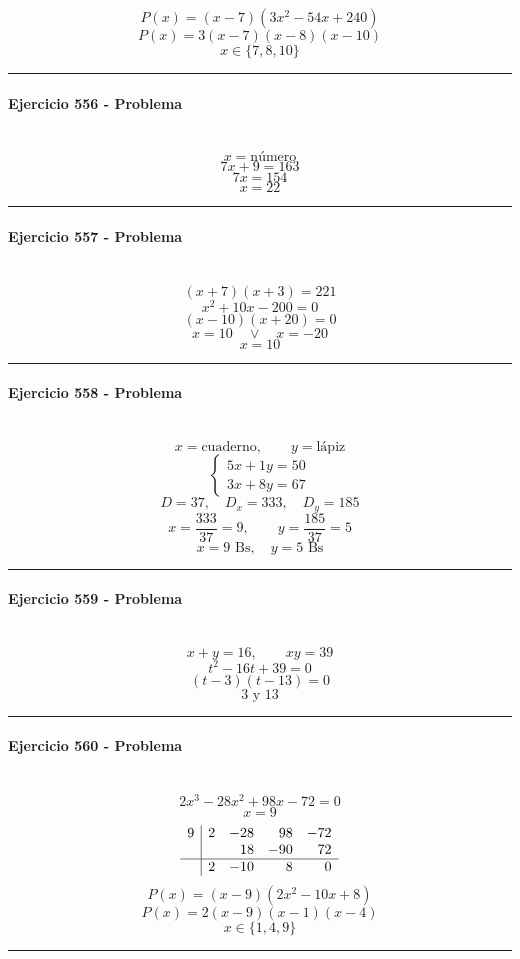 \documentclass[10pt,a4paper]{article}
\newcommand{\res}[1]{\paragraph{#1}\mbox{}\\[-1.2em]}
\begin{document}
\[ P(x)=(x-7)(3 x^{2} - 54 x + 240) \]
\[ P(x)=3(x-7)(x-8)(x-10) \]
\[ \boxed{x\in\{7,8,10\}} \]
\vspace{1mm}\hrule\vspace{2mm}
\res{Ejercicio 556 - Problema}
\[ x=\text{número} \]
\[ 7x+9=163 \]
\[ 7x=154 \]
\[ \boxed{x=22} \]
\vspace{1mm}\hrule\vspace{2mm}
\res{Ejercicio 557 - Problema}
\[ (x+7)(x+3)=221 \]
\[ x^{2} + 10 x - 200=0 \]
\[ (x-10)(x+20)=0 \]
\[ x=10\quad \vee \quad x=-20 \]
\[ \boxed{x=10} \]
\vspace{1mm}\hrule\vspace{2mm}
\res{Ejercicio 558 - Problema}
\[ x=\text{cuaderno},\qquad y=\text{lápiz} \]
\[ \begin{cases}5x+1y=50\\3x+8y=67\end{cases} \]
\[ D=37,\quad D_x=333,\quad D_y=185 \]
\[ x=\frac{333}{37}=9,\qquad y=\frac{185}{37}=5 \]
\[ \boxed{x=9\text{ Bs},\quad y=5\text{ Bs}} \]
\vspace{1mm}\hrule\vspace{2mm}
\res{Ejercicio 559 - Problema}
\[ x+y=16,\qquad xy=39 \]
\[ t^2-16t+39=0 \]
\[ (t-3)(t-13)=0 \]
\[ \boxed{3\text{ y }13} \]
\vspace{1mm}\hrule\vspace{2mm}
\res{Ejercicio 560 - Problema}
\[ 2 x^{3} - 28 x^{2} + 98 x - 72=0 \]
\[ x=9 \]
\[\begin{array}{r|rrrr}9 & 2 & -28 & 98 & -72\\  &  & 18 & -90 & 72\\\hline  & 2 & -10 & 8 & 0\end{array}\]
\[ P(x)=(x-9)(2 x^{2} - 10 x + 8) \]
\[ P(x)=2(x-9)(x-1)(x-4) \]
\[ \boxed{x\in\{1,4,9\}} \]
\vspace{1mm}\hrule\vspace{2mm}
\end{document}
